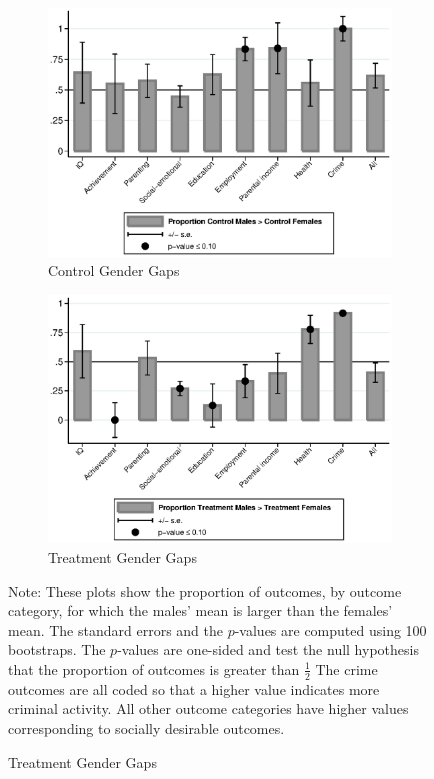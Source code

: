 \begin{figure}[!htbp]
\centering
\caption{Proportion of Outcomes Males $>$ Females, by Outcome Category}
\label{fig:proportion}
\begin{subfigure}[h]{0.8\textwidth}
	\centering
	\caption{Control Gender Gaps}
	\label{fig:means-sociab}
	\includegraphics[width=\textwidth]{output/gendergaps-fullcontrol}
\end{subfigure}

\begin{subfigure}[h]{0.8\textwidth}
	\centering
	\caption{Treatment Gender Gaps}
	\label{fig:means-years}
	\includegraphics[width=\textwidth]{output/gendergaps-treatment}
\end{subfigure} 
\footnotesize \justify
Note: These plots show the proportion of outcomes, by outcome category, for which the males' mean is larger than the females' mean. The standard errors and the $p$-values are computed using 100 bootstraps. The $p$-values are one-sided and test the null hypothesis that the proportion of outcomes is greater than $\frac{1}{2}$ The crime outcomes are all coded so that a higher value indicates more criminal activity. All other outcome categories have higher values corresponding to socially desirable outcomes. 
\end{figure}

